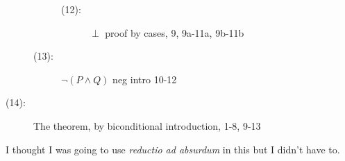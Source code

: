 \documentclass[12pt]{article}
\begin{document}
\begin{description}
\begin{description}
\begin{description}
\item[(12):]  $\perp$ proof by cases, 9, 9a-11a, 9b-11b

\end{description}

\item[(13):]  $\neg(P \wedge Q)$  neg intro 10-12

\end{description}

\item[(14):]  The theorem, by biconditional introduction, 1-8, 9-13

\end{description}

I thought I was going to use {\em reductio ad absurdum\/} in this but I didn't have to.

\newpage
\end{document}
